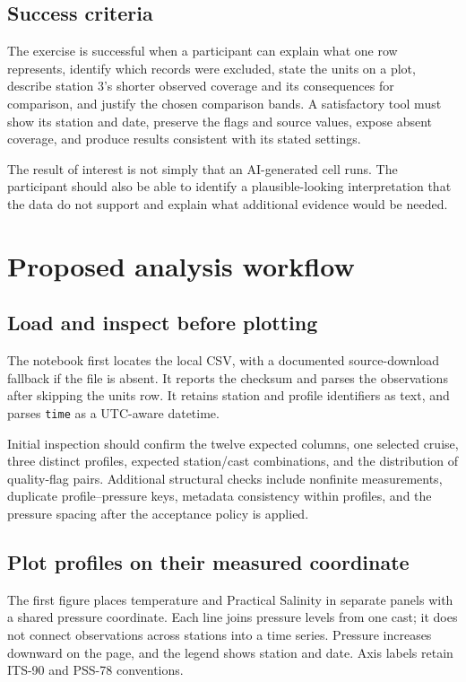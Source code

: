 \documentclass[11pt,letterpaper]{article}
\newcommand{\field}[1]{\nolinkurl{#1}}
\begin{document}
\subsection{Success criteria}
The exercise is successful when a participant can explain what one row represents, identify which records were excluded, state the units on a plot, describe station 3's shorter observed coverage and its consequences for comparison, and justify the chosen comparison bands. A satisfactory tool must show its station and date, preserve the flags and source values, expose absent coverage, and produce results consistent with its stated settings.

The result of interest is not simply that an AI-generated cell runs. The participant should also be able to identify a plausible-looking interpretation that the data do not support and explain what additional evidence would be needed.

\section{Proposed analysis workflow}
\label{sec:methods}

\subsection{Load and inspect before plotting}
The notebook first locates the local CSV, with a documented source-download fallback if the file is absent. It reports the checksum and parses the observations after skipping the units row. It retains station and profile identifiers as text, and parses \field{time} as a UTC-aware datetime.

Initial inspection should confirm the twelve expected columns, one selected cruise, three distinct profiles, expected station/cast combinations, and the distribution of quality-flag pairs. Additional structural checks include nonfinite measurements, duplicate profile--pressure keys, metadata consistency within profiles, and the pressure spacing after the acceptance policy is applied.

\subsection{Plot profiles on their measured coordinate}
The first figure places temperature and Practical Salinity in separate panels with a shared pressure coordinate. Each line joins pressure levels from one cast; it does not connect observations across stations into a time series. Pressure increases downward on the page, and the legend shows station and date. Axis labels retain ITS-90 and PSS-78 conventions.
\end{document}
